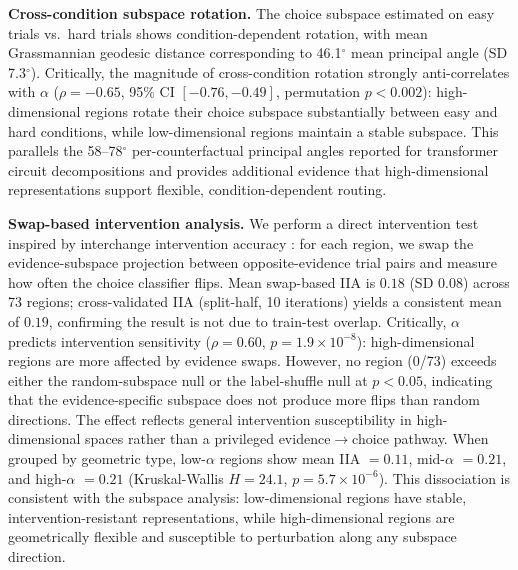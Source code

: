 \documentclass{article}
\begin{document}
\textbf{Cross-condition subspace rotation.} The choice subspace estimated on easy trials vs.\ hard trials shows condition-dependent rotation, with mean Grassmannian geodesic distance corresponding to 46.1$^{\circ}$ mean principal angle (SD 7.3$^{\circ}$). Critically, the magnitude of cross-condition rotation strongly anti-correlates with $\alpha$ ($\rho = -0.65$, 95\% CI $[-0.76, -0.49]$, permutation $p < 0.002$): high-dimensional regions rotate their choice subspace substantially between easy and hard conditions, while low-dimensional regions maintain a stable subspace. This parallels the 58--78$^{\circ}$ per-counterfactual principal angles reported for transformer circuit decompositions and provides additional evidence that high-dimensional representations support flexible, condition-dependent routing.

\textbf{Swap-based intervention analysis.} We perform a direct intervention test inspired by interchange intervention accuracy \citep{geiger2024finding}: for each region, we swap the evidence-subspace projection between opposite-evidence trial pairs and measure how often the choice classifier flips. Mean swap-based IIA is $0.18$ (SD $0.08$) across 73 regions; cross-validated IIA (split-half, 10 iterations) yields a consistent mean of $0.19$, confirming the result is not due to train-test overlap. Critically, $\alpha$ predicts intervention sensitivity ($\rho = 0.60$, $p = 1.9 \times 10^{-8}$): high-dimensional regions are more affected by evidence swaps. However, no region (0/73) exceeds either the random-subspace null or the label-shuffle null at $p < 0.05$, indicating that the evidence-specific subspace does not produce more flips than random directions. The effect reflects general intervention susceptibility in high-dimensional spaces rather than a privileged evidence$\to$choice pathway. When grouped by geometric type, low-$\alpha$ regions show mean IIA $= 0.11$, mid-$\alpha$ $= 0.21$, and high-$\alpha$ $= 0.21$ (Kruskal-Wallis $H = 24.1$, $p = 5.7 \times 10^{-6}$). This dissociation is consistent with the subspace analysis: low-dimensional regions have stable, intervention-resistant representations, while high-dimensional regions are geometrically flexible and susceptible to perturbation along any subspace direction.
\end{document}
